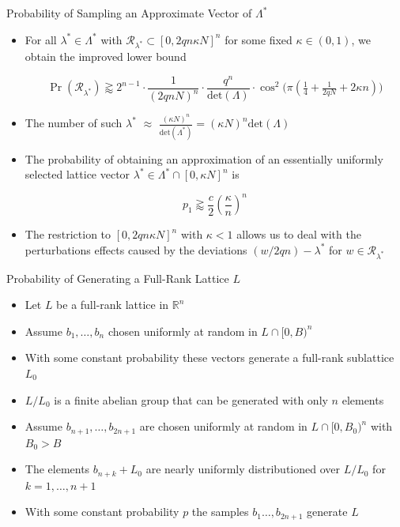 \documentclass{beamer}
\newcommand{\R}{\mathbb{R}}
\renewcommand{\>}{\rangle}
\newcommand{\<}{\langle}
\begin{document}
\begin{frame}{Probability of Sampling an Approximate Vector of $\Lambda^*$}

\begin{itemize}
\item For all $\lambda^*\in\Lambda^*$ with $\mathcal{R}_{\lambda^*}\subset[0,2qn\kappa N]^n$ for some fixed $\kappa\in(0,1)$, we obtain the improved lower bound

\[
\Pr(\mathcal{R_{\lambda^*}} ) \gtrapprox  
2^{n-1} \cdot \frac{1}{(2qnN)^n} \cdot \frac{q^n}{\mathrm{det}(\Lambda)} \cdot \cos^2\big( \pi (\tfrac{1}{4} + \tfrac{1}{2qN} + 2\kappa n) \big) 
\]

\medskip
\item The number of such $\lambda^*$ $\approx$ $\tfrac{(\kappa N)^n}{\mathrm{det}(\Lambda^*)} = (\kappa N)^n \mathrm{det}(\Lambda)$

\medskip
\item The probability of obtaining an approximation of an essentially uniformly selected lattice vector $\lambda^* \in \Lambda^* \cap [0,\kappa N]^n$ is 

\[
p_1 \gtrapprox \frac{c}{2} \left(\frac{\kappa}{n}\right)^n
\]

\item The restriction to $[0,2qn\kappa N]^n$ with $\kappa<1$ allows us to deal with the perturbations effects caused by the deviations $(w/2qn) - \lambda^*$ for $w\in\mathcal{R}_{\lambda^*}$
\end{itemize}

\end{frame}


\begin{frame}{Probability of Generating a Full-Rank Lattice $L$}
\begin{itemize}
\item Let $L$ be a full-rank lattice in $\R^n$

\medskip
\item Assume $b_1,\ldots,b_n$ chosen uniformly at random in $L \cap [0,B)^n$ 

\medskip
\item With some constant probability these vectors generate a full-rank sublattice $L_0$

\medskip
\item $L/L_0$ is a finite abelian group that can be generated with only $n$ elements

\medskip
\item Assume $b_{n+1},\ldots,b_{2n+1}$ are chosen uniformly at random in $L \cap [0,B_0)^n$ with $B_0 > B$

\medskip
\item The elements $b_{n+k}+L_0$ are nearly uniformly distributioned over $L/L_0$ for $k=1,\ldots,n+1$

\medskip
\item With some constant probability $p$ the samples $b_1\ldots,b_{2n+1}$ generate $L$ 

\end{itemize}

\end{frame}
\end{document}
